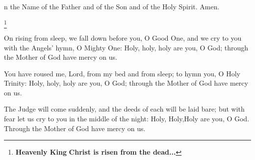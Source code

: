 
n the Name of the Father and of the Son and of the Holy Spirit. Amen.

\heavenlyking
\footnote{ \textbf{Heavenly King} \textbf{Christ is risen from the dead...} }


\trisagion


On rising from sleep, we fall down before you, O Good One,
and we cry to you with the Angels' hymn, O Mighty One:
Holy, holy, holy are you, O God;
through the Mother of God have mercy on us.


You have roused me, Lord, from my bed and from sleep;
to hymn you, O Holy Trinity:
Holy, holy, holy are you, O God;
through the Mother of God have mercy on us.


The Judge will come suddenly, and the deeds of each will be
laid bare;
but with fear let us cry to you in the middle of the night:
Holy, Holy,Holy are you, O God.
Through the Mother of God have mercy on us.\rest



\psalmonetwenty\rest

\glorybothnow


\creed

